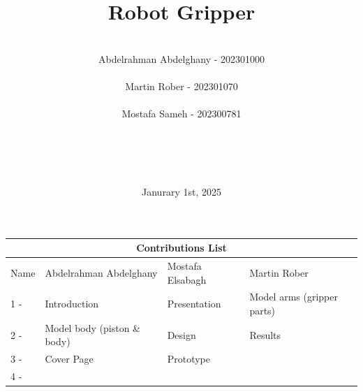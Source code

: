 \documentclass{article}
\title{Robot Gripper}
\author{ \\ Abdelrahman Abdelghany - 202301000 \\ \\ Martin Rober - 202301070 \\ \\ Mostafa Sameh - 202300781 \\ \\ \\ \\ \\  }
\date{Janurary 1st, 2025}
\begin{document}
\maketitle

\newpage
\begin{tabular}{ |p{1cm}||p{5cm}|p{3cm}|p{3cm}|}
    \hline
    \multicolumn{4}{|c|}{Contributions List} \\
    \hline
    Name & Abdelrahman Abdelghany & Mostafa Elsabagh & Martin Rober \\
    \hline
   
   1 - & Introduction & Presentation & Model arms (gripper parts) \\
   2 - & Model body (piston \& body)  & Design & Results \\
   3 - & Cover Page  & Prototype & \\
   4 - &   & \\
    \hline
   \end{tabular}
   \newpage

\newpage
\end{document}
